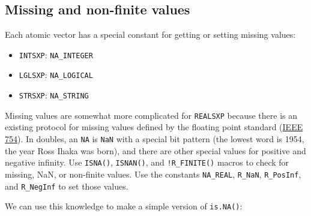 \subsection{Missing and non-finite values}

Each atomic vector has a special constant for getting or setting missing
values:

\begin{itemize}
\itemsep1pt\parskip0pt
\item
  \texttt{INTSXP}: \texttt{NA\_INTEGER}
\item
  \texttt{LGLSXP}: \texttt{NA\_LOGICAL}
\item
  \texttt{STRSXP}: \texttt{NA\_STRING}
\end{itemize}

Missing values are somewhat more complicated for \texttt{REALSXP}
because there is an existing protocol for missing values defined by the
floating point standard
(\href{http://en.wikipedia.org/wiki/IEEE_floating_point}{IEEE 754}). In
doubles, an \texttt{NA} is \texttt{NaN} with a special bit pattern (the
lowest word is 1954, the year Ross Ihaka was born), and there are other
special values for positive and negative infinity. Use \texttt{ISNA()},
\texttt{ISNAN()}, and \texttt{!R\_FINITE()} macros to check for missing,
NaN, or non-finite values. Use the constants \texttt{NA\_REAL},
\texttt{R\_NaN}, \texttt{R\_PosInf}, and \texttt{R\_NegInf} to set those
values. 

We can use this knowledge to make a simple version of \texttt{is.NA()}:

